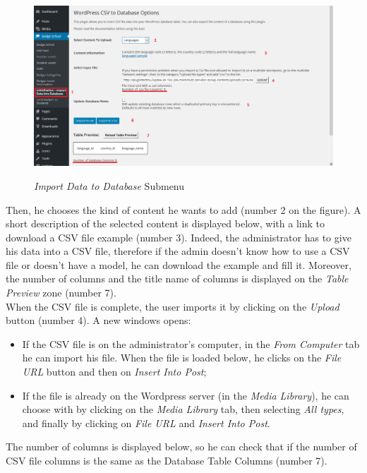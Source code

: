 \documentclass[a4paper, 12pt]{report}
\begin{document}
	\begin{figure}[h]
		\caption{\textit{Import Data to Database} Submenu}
		\includegraphics[scale=0.45]{includes/importDataIntoDB}
		\label{importDataIntoDB}
	\end{figure}
	
	
	Then, he chooses the kind of content he wants to add (number 2 on the figure). A short description of the selected content is displayed below, with a link to download a CSV file example (number 3). Indeed, the administrator has to give his data into a CSV file, therefore if the admin doesn't know how to use a CSV file or doesn't have a model, he can download the example and fill it. Moreover, the number of columns and the title name of columns is displayed on the \textit{Table Preview} zone (number 7).\\ 
	
	When the CSV file is complete, the user imports it by clicking on the \textit{Upload} button (number 4). A new windows opens:
	\begin{itemize}
		\item If the CSV file is on the administrator's computer, in the \textit{From Computer} tab he can import his file. When the file is loaded below, he clicks on the \textit{File URL} button and then on \textit{Insert Into Post};
		\item If the file is already on the Wordpress server (in the \textit{Media Library}), he can choose with by clicking on the \textit{Media Library} tab, then selecting \textit{All types}, and finally by clicking on \textit{File URL} and \textit{Insert Into Post}.
	\end{itemize}
	The number of columns is displayed below, so he can check that if the number of CSV file columns is the same as the Database Table Columns (number 7).\\
	
\end{document}
